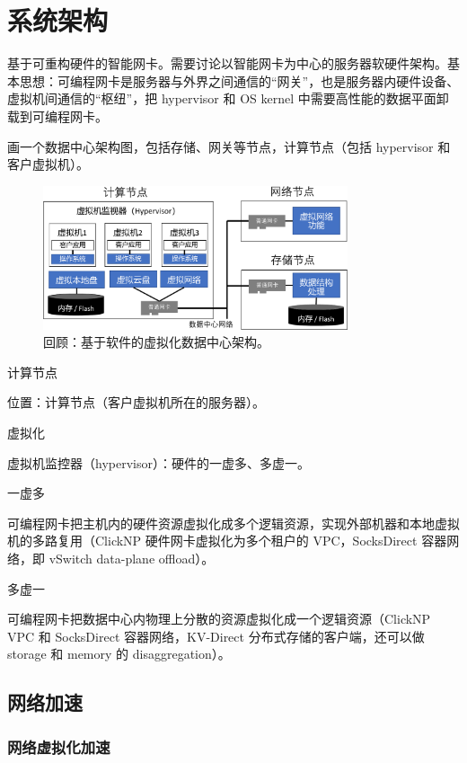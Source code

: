 \chapter{系统架构}

基于可重构硬件的智能网卡。需要讨论以智能网卡为中心的服务器软硬件架构。基本思想：可编程网卡是服务器与外界之间通信的“网关”，也是服务器内硬件设备、虚拟机间通信的“枢纽”，把 hypervisor 和 OS kernel 中需要高性能的数据平面卸载到可编程网卡。

画一个数据中心架构图，包括存储、网关等节点，计算节点（包括 hypervisor 和客户虚拟机）。


\begin{figure}[htbp]
	\centering
	\includegraphics[width=0.8\textwidth]{figures/virt_arch.pdf}
	\caption{回顾：基于软件的虚拟化数据中心架构。}
	\label{arch:fig:virt-architecture}
\end{figure}



计算节点

位置：计算节点（客户虚拟机所在的服务器）。

虚拟化

虚拟机监控器（hypervisor）：硬件的一虚多、多虚一。

一虚多

可编程网卡把主机内的硬件资源虚拟化成多个逻辑资源，实现外部机器和本地虚拟机的多路复用（ClickNP 硬件网卡虚拟化为多个租户的 VPC，SocksDirect 容器网络，即 vSwitch data-plane offload）。

多虚一

可编程网卡把数据中心内物理上分散的资源虚拟化成一个逻辑资源（ClickNP VPC 和 SocksDirect 容器网络，KV-Direct 分布式存储的客户端，还可以做 storage 和 memory 的 disaggregation）。


\section{网络加速}

\subsection{网络虚拟化加速}

